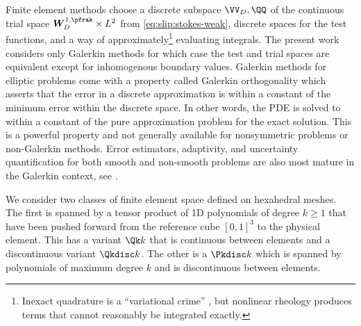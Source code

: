 Finite element methods choose a discrete subspace $\VV_D,\QQ$ of the continuous trial space $\bm W_D^{1,\pfrak} \times L^2$ from \eqref{eq:slip:stokes-weak}, discrete spaces for the test functions, and a way of approximately\footnote{Inexact quadrature is a ``variational crime'' \citep{brenner2008mathematical}, but nonlinear rheology produces terms that cannot reasonably be integrated exactly.} evaluating integrals.
The present work considers only Galerkin methods for which case the test and trial spaces are equivalent except for inhomogenous boundary values.
Galerkin methods for elliptic problems come with a property called Galerkin orthogonality which asserts that the error in a discrete approximation is within a constant of the minimum error within the discrete space.
In other words, the PDE is solved to within a constant of the pure approximation problem for the exact solution.
This is a powerful property and not generally available for nonsymmetric problems or non-Galerkin methods.
Error estimators, adaptivity, and uncertainty quantification for both smooth and non-smooth problems are also most mature in the Galerkin context, see \citet{ainsworth1997pee,matthies2005gml,babuska2005scm,barth2010mlmcfe}.

We consider two classes of finite element space defined on hexahedral meshes.
The first is spanned by a tensor product of 1D polynomials of degree $k \ge 1$ that have been pushed forward from the reference cube $[0,1]^3$ to the physical element.
This has a variant $\Qk k$ that is continuous between elements and a discontinuous variant $\Qkdisc k$.
The other is a $\Pkdisc k$ which is spanned by polynomials of maximum degree $k$ and is discontinuous between elements.

